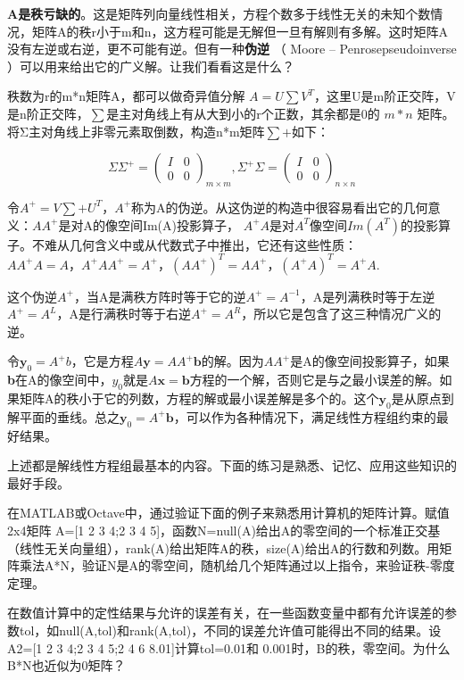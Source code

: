 \textbf{A是秩亏缺的}。这是矩阵列向量线性相关，方程个数多于线性无关的未知个数情况，矩阵A的秩r小于m和n，这方程可能是无解但一旦有解则有多解。这时矩阵A没有左逆或右逆，更不可能有逆。但有一种\textbf{伪逆} （ Moore – Penrosepseudoinverse ）可以用来给出它的广义解。让我们看看这是什么？

秩数为r的m*n矩阵A，都可以做奇异值分解 $ A= U\sum V^T $，这里U是m阶正交阵，V是n阶正交阵，$ \sum $是主对角线上有从大到小的r个正数，其余都是0的 $ m*n $ 矩阵。将Σ主对角线上非零元素取倒数，构造n*m矩阵$ \sum + $如下：

\[\Sigma \Sigma^+ = \begin{pmatrix}I&0\\0&0\end{pmatrix}_{m\times m},  \Sigma ^+\Sigma = \begin{pmatrix}I&0\\0&0\end{pmatrix}_{n\times n}\]

令$ A^+=V\sum+U^T $，$ A^+ $称为A的伪逆。从这伪逆的构造中很容易看出它的几何意义：$ AA^+ $是对A的像空间Im(A)投影算子， $ A^+A $是对$ A^T $像空间$ Im(A^T) $的投影算子。不难从几何含义中或从代数式子中推出，它还有这些性质：$ AA^+A=A，A^+AA^+=A^+，(AA^+)^T=AA^+，(A^+A)^T=A^+A $.

这个伪逆$ A^+ $，当A是满秩方阵时等于它的逆$ A^+=A^{-1} $，A是列满秩时等于左逆$ A^+=A^L $，A是行满秩时等于右逆$ A^+=A^R $，所以它是包含了这三种情况广义的逆。

令$ \bm{y}_0=A^+b $，它是方程$ A\bm{y}=AA^+\bm{b} $的解。因为$ AA^+ $是A的像空间投影算子，如果\textbf{b}在A的像空间中，$ y_0 $就是$ A\bm{x}=\bm{b} $方程的一个解，否则它是与之最小误差的解。如果矩阵A的秩小于它的列数，方程的解或最小误差解是多个的。这个$ \bm{y}_0 $是从原点到解平面的垂线。总之$ \bm{y}_0=A^+\bm{b} $，可以作为各种情况下，满足线性方程组约束的最好结果。

上述都是解线性方程组最基本的内容。下面的练习是熟悉、记忆、应用这些知识的最好手段。

\kaishu

在MATLAB或Octave中，通过验证下面的例子来熟悉用计算机的矩阵计算。赋值2x4矩阵 A=[1 2 3 4;2 3 4 5]，函数N=null(A)给出A的零空间的一个标准正交基（线性无关向量组），rank(A)给出矩阵A的秩，size(A)给出A的行数和列数。用矩阵乘法A*N，验证N是A的零空间，随机给几个矩阵通过以上指令，来验证秩-零度定理。

在数值计算中的定性结果与允许的误差有关，在一些函数变量中都有允许误差的参数tol，如null(A,tol)和rank(A,tol)，不同的误差允许值可能得出不同的结果。设A2=[1 2 3 4;2 3 4 5;2 4 6 8.01]计算tol=0.01和 0.001时，B的秩，零空间。为什么B*N也近似为0矩阵？

